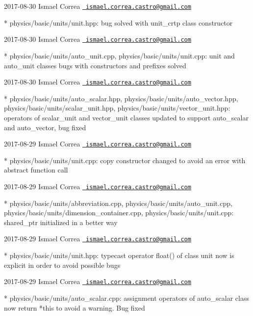  2017-\/08-\/30 Ismael Correa \href{mailto:ismael.correa.castro@gmail.com}{\texttt{ ismael.\+correa.\+castro@gmail.\+com}} \begin{DoxyVerb}* physics/basic/units/unit.hpp: bug solved with unit_crtp class
constructor
\end{DoxyVerb}
 2017-\/08-\/30 Ismael Correa \href{mailto:ismael.correa.castro@gmail.com}{\texttt{ ismael.\+correa.\+castro@gmail.\+com}} \begin{DoxyVerb}* physics/basic/units/auto_unit.cpp, physics/basic/units/unit.cpp: 
unit and auto_unit classes bugs with constructors and prefixes
solved
\end{DoxyVerb}
 2017-\/08-\/30 Ismael Correa \href{mailto:ismael.correa.castro@gmail.com}{\texttt{ ismael.\+correa.\+castro@gmail.\+com}} \begin{DoxyVerb}* physics/basic/units/auto_scalar.hpp,
physics/basic/units/auto_vector.hpp,
physics/basic/units/scalar_unit.hpp,
physics/basic/units/vector_unit.hpp: operators of scalar_unit and
vector_unit classes updated to support auto_scalar and auto_vector,
bug fixed
\end{DoxyVerb}
 2017-\/08-\/29 Ismael Correa \href{mailto:ismael.correa.castro@gmail.com}{\texttt{ ismael.\+correa.\+castro@gmail.\+com}} \begin{DoxyVerb}* physics/basic/units/unit.cpp: copy constructor changed to avoid an
error with abstract function call
\end{DoxyVerb}
 2017-\/08-\/29 Ismael Correa \href{mailto:ismael.correa.castro@gmail.com}{\texttt{ ismael.\+correa.\+castro@gmail.\+com}} \begin{DoxyVerb}* physics/basic/units/abbreviation.cpp,
physics/basic/units/auto_unit.cpp,
physics/basic/units/dimension_container.cpp,
physics/basic/units/unit.cpp: shared_ptr initialized in a better way
\end{DoxyVerb}
 2017-\/08-\/29 Ismael Correa \href{mailto:ismael.correa.castro@gmail.com}{\texttt{ ismael.\+correa.\+castro@gmail.\+com}} \begin{DoxyVerb}* physics/basic/units/unit.hpp: typecast operator float() of class
unit now is explicit in order to avoid possible bugs
\end{DoxyVerb}
 2017-\/08-\/29 Ismael Correa \href{mailto:ismael.correa.castro@gmail.com}{\texttt{ ismael.\+correa.\+castro@gmail.\+com}} \begin{DoxyVerb}* physics/basic/units/auto_scalar.cpp: assignment operators of
auto_scalar class now return *this to avoid a warning. Bug fixed
\end{DoxyVerb}
